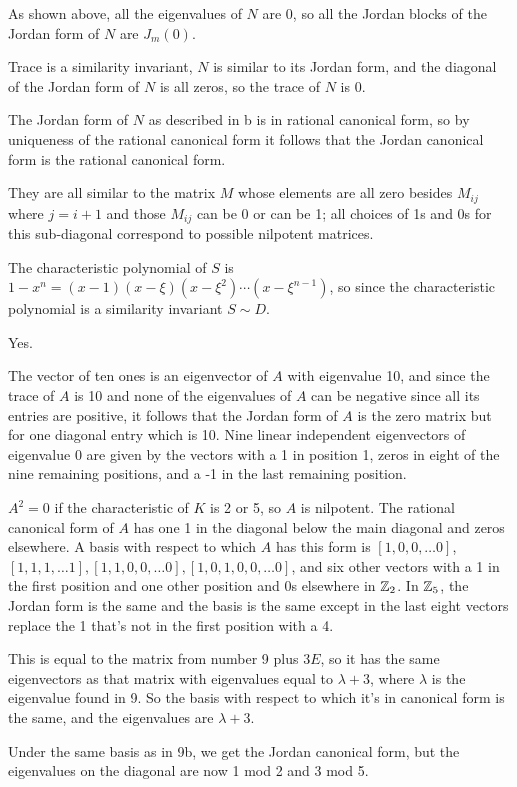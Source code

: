 \documentclass[11pt, oneside]{article}   	%
\begin{document}
\item As shown above, all the eigenvalues of $N$ are 0, so all the Jordan blocks of the Jordan form of $N$ are $J_m(0)$.
\item Trace is a similarity invariant, $N$ is similar to its Jordan form, and the diagonal of the Jordan form of $N$ is all zeros, so the trace of $N$ is 0.
\item The Jordan form of $N$ as described in b is in rational canonical form, so by uniqueness of the rational canonical form it follows that the Jordan canonical form is the rational canonical form. 
\ee
\item They are all similar to the matrix $M$ whose elements are all zero besides $M_{ij}$ where $j = i+1$ and those $M_{ij}$ can be 0 or can be 1; all choices of 1s and 0s for this sub-diagonal correspond to possible nilpotent matrices.
\item \be
\item The characteristic polynomial of $S$ is $1-x^n = (x-1)(x-\xi)(x-\xi^2)\cdots(x-\xi^{n-1})$, so since the characteristic polynomial is a similarity invariant $S \sim D$.
\item Yes.
\ee
\item \be
\item The vector of ten ones is an eigenvector of $A$ with eigenvalue 10, and since the trace of $A$ is 10 and none of the eigenvalues of $A$ can be negative since all its entries are positive, it follows that the Jordan form of $A$ is the zero matrix but for one diagonal entry which is 10. Nine linear independent eigenvectors of eigenvalue 0 are given by the vectors with a 1 in position 1, zeros in eight of the nine remaining positions, and a -1 in the last remaining position.
\item $A^2 = 0$ if the characteristic of $K$ is 2 or 5, so $A$ is nilpotent. The rational canonical form of $A$ has one 1 in the diagonal below the main diagonal and zeros elsewhere. A basis with respect to which $A$ has this form is $[1, 0, 0, \ldots 0]$, $[1, 1, 1, \ldots 1], [1, 1, 0, 0, \ldots 0], [1, 0, 1, 0, 0, \ldots 0]$, and six other vectors with a 1 in the first position and one other position and 0s elsewhere in $\mathbb{Z}_2$. In $\mathbb{Z}_5$, the Jordan form is the same and the basis is the same except in the last eight vectors replace the 1 that's not in the first position with a 4.
\ee
\item \be
\item This is equal to the matrix from number 9 plus $3E$, so it has the same eigenvectors as that matrix with eigenvalues equal to $\lambda + 3$, where $\lambda$ is the eigenvalue found in 9. So the basis with respect to which it's in canonical form is the same, and the eigenvalues are $\lambda + 3$.
\item Under the same basis as in 9b, we get the Jordan canonical form, but the eigenvalues on the diagonal are now 1 mod 2 and 3 mod 5.
\ee
\ee
\end{document}
